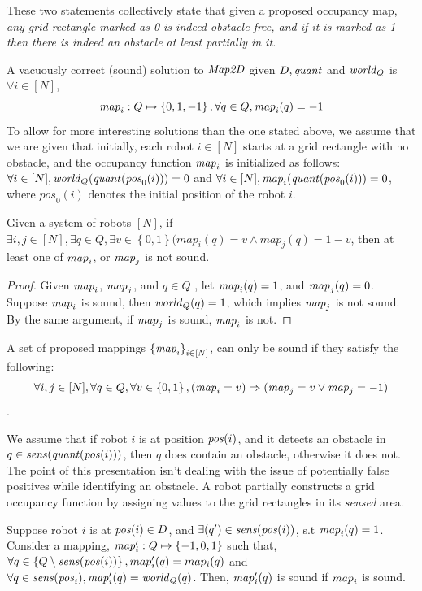 These two statements collectively state that given a proposed occupancy map, \emph{any grid rectangle marked as 0 is indeed obstacle free, and if it is marked as 1 then there is indeed an obstacle at least partially in it.}

A vacuously correct (sound) solution to $\mathit{Map2D}$ given $D, \mathit{quant}$ and $\mathit{world}_Q$ is $\forall i \in [N]$, $$\mathit{map}_i : Q \mapsto \left\{0,1,-1\right\}, \forall  q \in Q , \mathit{map}_i(q)= -1$$ To allow for more interesting solutions than the one stated above, we assume that we are given that initially, each robot $i\in[N]$ starts at a grid rectangle with no obstacle, and the occupancy function $\mathit{map}_i$ is initialized as follows:
 $\forall i \in [N], \mathit{world}_Q(\mathit{quant}(\mathit{pos}_0(i))) = 0$ and 
 $\forall i \in [N], \mathit{map}_i(\mathit{quant}(\mathit{pos}_0(i))) = 0$,
  where $\mathit{pos}_0(i)$ denotes the initial position of the robot $i$. 




\begin{lemma}
    \label{comptbl}
 Given a system of robots $[N]$, if $\exists i , j \in [N], \exists  q \in Q, \exists v \in \left\{0,1\right\} (map_i(q) = v \wedge
 map_j(q) = 1 - v $, then at least one of $\mathit{map}_i$, or $\mathit{map}_j$ is not sound.
\end{lemma}

\begin{proof}
Given $\mathit{map}_i$, $\mathit{map}_j$, and $q\in Q$ , let $\mathit{map}_i(q) = 1$, and $\mathit{map}_j(q) = 0$. Suppose $\mathit{map}_i$ is sound, then $\mathit{world}_Q(q) = 1$, which implies $\mathit{map}_j$ is not sound. By the same argument, if $\mathit{map}_j$ is sound, $\mathit{map}_i$ is not. 
\end{proof}

A set of proposed mappings $\left\{\mathit{map}_i\right\}_{i\in [N]}$, can only be sound if they satisfy the following: $$\forall i,j \in [N],\forall q\in Q, \forall v \in \left\{0,1\right\}, (\mathit{map}_i = v) \Rightarrow (\mathit{map}_j = v \vee \mathit{map}_j = -1)$$.

We assume that if robot $i$ is at position $\mathit{pos}(i)$, and it detects an obstacle in $q \in \mathit{sens}(\mathit{quant}(\mathit{pos}(i)))$, then $q$ does contain an obstacle, otherwise it does not. The point of this presentation isn't dealing with the issue of potentially false positives while identifying an obstacle. A robot partially constructs a grid occupancy function by assigning values to the grid rectangles in its \emph{sensed} area.

\begin{lemma}Suppose robot $i$ is at $\mathit{pos}(i)\in D$, and $\exists(q^\prime)\in \mathit{sens}(\mathit{pos}(i))$,
s.t $\mathit{map}_i(q) = 1$. Consider a mapping, $\mathit{map}^\prime_i:Q \mapsto \left\{-1,0,1\right\}$
such that, $\forall q\in \left\{Q \setminus \mathit{sens}(\mathit{pos}(i))\right\}, map^\prime_i(q) = map_i(q)$
and $\forall q \in \mathit{sens}(\mathit{pos}_i), \mathit{map}^\prime_i(q) = \mathit{world}_Q(q)$.
Then, $\mathit{map}^\prime_i(q)$ is sound if $\mathit{map}_i$ is sound.
\end{lemma}

